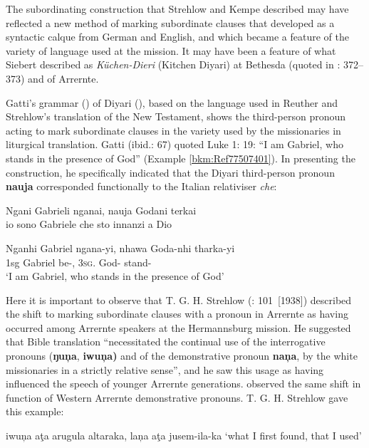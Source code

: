 The subordinating construction that Strehlow and Kempe described may have reflected a new method of marking subordinate clauses that developed as a syntactic calque from German and English, and which became a feature of the variety of language used at the mission. It may have been a feature of what Siebert described as \textit{Küchen-Dieri} (Kitchen Diyari) at Bethesda (quoted in \citealt{kneebone_teichelmann_2005}: 372--373) and of Arrernte.

Gatti’s grammar (\citeyear{gatti_lingua_1930}) of Diyari (), based on the language used in Reuther and Strehlow’s translation of the New Testament, shows the third-person pronoun acting to mark subordinate clauses in the variety used by the missionaries in liturgical translation. Gatti (ibid.: 67) quoted Luke 1: 19: “I am Gabriel, who stands in the presence of God” (Example \ref{bkm:Ref77507401}). In presenting the construction, he specifically indicated that the Diyari third-person pronoun \textbf{nauja} corresponded functionally to the Italian relativiser \textit{che}:

\ea
      \label{bkm:Ref77507401}Ngani   Gabrieli   nganai,          nauja    Godani    terkai\\
 \glt io sono Gabriele che sto innanzi a Dio

\citep[67]{gatti_lingua_1930}

\gll Nganhi Gabriel    ngana-yi,     nhawa   Goda-nhi tharka-yi\\
    1sg Gabriel  be-,     3\textsc{sg}.   God-  stand-\\
\glt `I am Gabriel, who stands in the presence of God'
\z

Here it is important to observe that T. G. H. Strehlow (\citeyear{strehlow_aranda_1944}: 101~[1938]) described the shift to marking subordinate clauses with a pronoun in Arrernte as having occurred among Arrernte speakers at the Hermannsburg mission. He suggested that Bible translation “necessitated the continual use of the interrogative pronouns (\textbf{ŋu\c{n}a}, \textbf{iwu\c{n}a)} and of the demonstrative pronoun \textbf{na\c{n}a}, by the white missionaries in a strictly relative sense”, and he saw this usage as having influenced the speech of younger Arrernte generations. \citet[13]{capell_outline_1958} observed the same shift in function of Western Arrernte demonstrative pronouns. T. G. H. Strehlow gave this example:

\ea
iwu\c{n}a              aţa      arugula   altaraka,      la\c{n}a    aţa      jusem-ila-ka
\glt `what I first found, that I used'

